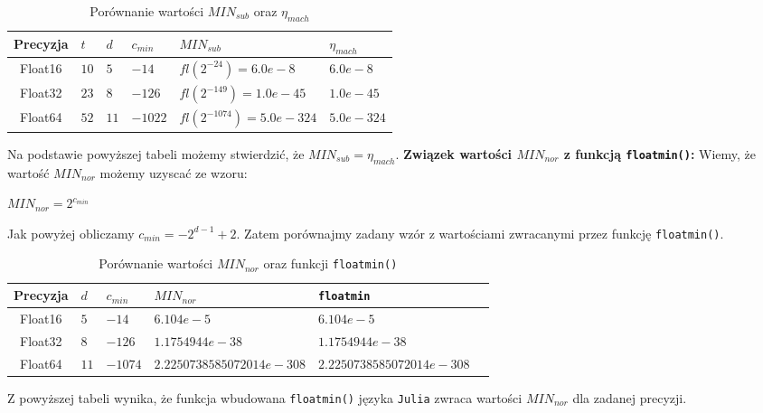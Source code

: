 \documentclass[12pt]{article}
\begin{document}
        \newpage

        \begin{table}[h!]
            \centering
            \begin{tabularx}{0.73\textwidth}{c l l l l l}
                \hline
                Precyzja & $t$ & $d$ & $c_{min}$ & $MIN_{sub}$ & $\eta_{mach}$ \\
                \hline
                Float16 & $10$ & $5$ & $-14$ & $fl(2^{-24}) = 6.0e-8$ & $6.0e-8$ \\
                Float32 & $23$ & $8$ & $-126$ & $fl(2^{-149}) = 1.0e-45$ & $1.0e-45$ \\
                Float64 & $52$ & $11$ & $-1022$ & $fl(2^{-1074}) = 5.0e-324$ & $5.0e-324$ \\
                \hline
            \end{tabularx}
            \caption{Porównanie wartości $MIN_{sub}$ oraz $\eta_{mach}$}
            \label{table:minsub_macheta}
        \end{table}

        \noindent Na podstawie powyższej tabeli możemy stwierdzić, że $MIN_{sub} = \eta_{mach}$.
        \newline\newline\newline
        \noindent\textbf{Związek wartości $MIN_{nor}$ z funkcją \texttt{floatmin()}:}
        Wiemy, że wartość $MIN_{nor}$ możemy uzyscać ze wzoru:
        \begin{center}
        \begin{math}
            MIN_{nor} = 2^{c_{min}}
        \end{math}
        \end{center}
        Jak powyżej obliczamy $c_{min} = -2^{d-1} + 2$.
        \newline
        Zatem porównajmy zadany wzór z wartościami zwracanymi przez funkcję \texttt{floatmin()}.
        \begin{table}[h!]
            \centering
            \begin{tabularx}{0.91\textwidth}{c l l l l l}
                \hline
                Precyzja & $d$ & $c_{min}$ & $MIN_{nor}$ & \texttt{floatmin} \\
                \hline
                Float16 & $5$ & $-14$ & $6.104e-5$ & $6.104e-5$ \\
                Float32 & $8$ & $-126$ & $1.1754944e-38$ & $1.1754944e-38$ \\
                Float64 & $11$ & $-1074$ & $2.2250738585072014e-308$ & $2.2250738585072014e-308$ \\
                \hline
            \end{tabularx}
            \caption{Porównanie wartości $MIN_{nor}$ oraz funkcji \texttt{floatmin()}}
            \label{table:minnor_floatmin}
        \end{table}
        \noindent Z powyższej tabeli wynika, że funkcja wbudowana \texttt{floatmin()} języka \texttt{Julia}
        zwraca wartości $MIN_{nor}$ dla zadanej precyzji.
\end{document}
